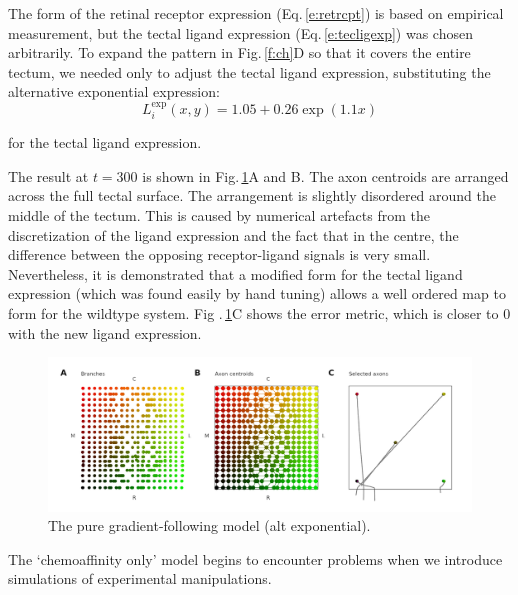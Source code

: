 \documentclass[11pt, a4paper]{article}
\begin{document}
The form of the retinal receptor expression (Eq.\,\ref{e:retrcpt}) is based on
empirical measurement, but the tectal ligand expression
(Eq.\,\ref{e:tecligexp}) was chosen arbitrarily. To expand the pattern in
Fig.\,\ref{f:ch}D so that it covers the entire tectum, we needed only to
adjust the tectal ligand expression, substituting the alternative exponential
expression:
%
\begin{equation} \label{e:tecligexp2}
L_i^{\text{exp}}(x,y) = 1.05 + 0.26 \exp(1.1 x)
\end{equation}

for the tectal ligand expression.

The result at $t=300$ is shown in Fig.\,\ref{f:chalt}A and B. The axon
centroids are arranged across the full tectal surface.  The arrangement is
slightly disordered around the middle of the tectum. This is caused by
numerical artefacts from the discretization of the ligand expression and the
fact that in the centre, the difference between the opposing receptor-ligand
signals is very small. Nevertheless, it is demonstrated that a modified form
for the tectal ligand expression (which was found easily by hand tuning)
allows a well ordered map to form for the wildtype system. Fig
.\,\ref{f:chalt}C shows the error metric, which is closer to 0 with the new
ligand expression.

\begin{figure}
\includegraphics[width=\linewidth]{./images/j4_eE_G_wt_fig3.png}
\caption{The pure gradient-following model (alt exponential).}
\label{f:chalt}
\end{figure}

The `chemoaffinity only' model begins to encounter problems when we introduce
simulations of experimental manipulations.

\end{document}
